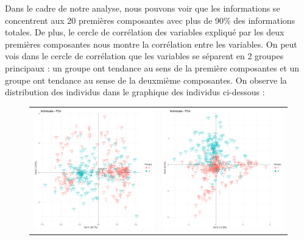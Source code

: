 \documentclass[a4paper,11pt,oneside,roman]{article}
\begin{document}
Dans le cadre de notre analyse, nous pouvons voir que les informations se concentrent aux 20 premières composantes avec plus de 90\% des informations totales. De plus, le cercle de corrélation des variables expliqué par les deux premières composantes nous montre la corrélation entre les variables. On peut vois dans le cercle de corrélation que les variables se séparent en 2 groupes principaux : un groupe ont tendance  au sens de la première composantes et un groupe ont tendance au sense de la deuxmième composantes. On observe la distribution des individus dans le graphique des individus ci-dessous : 
\begin{figure}[htb]
    \centering
    \begin{tabular}{cc}
    \includegraphics[scale = .3]{./discrimination/ionosphere/indi_plot12.png} &
    \includegraphics[scale = .3]{./discrimination/ionosphere/indi_plot23.png} 

\end{tabular}
\end{figure}
\end{document}
